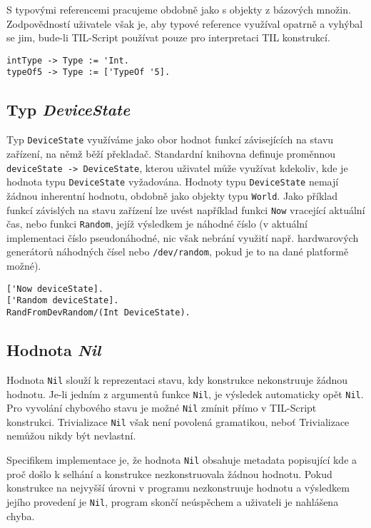 S typovými referencemi pracujeme obdobně jako s objekty z bázových množin. Zodpovědností uživatele
však je, aby typové reference využíval opatrně a vyhýbal se jim, bude-li TIL-Script používat pouze
pro interpretaci TIL konstrukcí.

\begin{lstlisting}[caption={Příklad využití typových referencí}]
intType -> Type := 'Int.
typeOf5 -> Type := ['TypeOf '5].
\end{lstlisting}

\subsection{Typ \textit{DeviceState}}

Typ \lstinline{DeviceState} využíváme jako obor hodnot funkcí závisejících na stavu zařízení,
na němž běží překladač. Standardní knihovna definuje proměnnou
\lstinline{deviceState -> DeviceState}, kterou uživatel může využívat kdekoliv, kde je hodnota typu
\lstinline{DeviceState} vyžadována. Hodnoty typu \lstinline{DeviceState} nemají žádnou inherentní
hodnotu, obdobně jako objekty typu \lstinline{World}. Jako příklad funkcí závislých na stavu
zařízení lze uvést například funkci \lstinline{Now} vracející aktuální čas, nebo funkci
\lstinline{Random}, jejíž výsledkem je náhodné číslo (v aktuální implementaci číslo pseudonáhodné,
nic však nebrání využití např. hardwarových generátorů náhodných čísel nebo
\lstinline{/dev/random}, pokud je to na dané platformě možné).

\begin{lstlisting}[caption={Příklad funkcí závislých na stavu zařízení}]
['Now deviceState].
['Random deviceState].
RandFromDevRandom/(Int DeviceState).
\end{lstlisting}

\subsection{Hodnota \textit{Nil}} \label{nil-value}

Hodnota \lstinline{Nil} slouží k reprezentaci stavu, kdy konstrukce nekonstruuje žádnou hodnotu.
Je-li jedním z argumentů funkce \lstinline{Nil}, je výsledek automaticky opět \lstinline{Nil}.
Pro vyvolání chybového stavu je možné \lstinline{Nil} zmínit přímo v TIL-Script konstrukci.
Trivializace \lstinline{Nil} však není povolená gramatikou, neboť Trivializace nemůžou nikdy
být nevlastní.

Specifikem implementace je, že hodnota \lstinline{Nil} obsahuje metadata popisující kde a proč
došlo k selhání a konstrukce nezkonstruovala žádnou hodnotu. Pokud konstrukce na nejvyšší úrovni
v programu nezkonstruuje hodnotu a výsledkem jejího provedení je \lstinline{Nil}, program skončí
neúspěchem a uživateli je nahlášena chyba.

